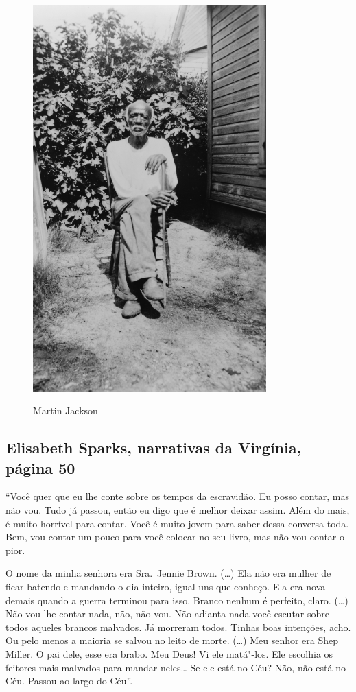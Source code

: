 \pagebreak
\thispagestyle{empty}
\begin{figure}[!ht]
\centering
 \includegraphics[width=90mm]{./imgs/martinjackson_recorte.jpg} \label{img13}
\caption{Martin Jackson}
\end{figure}

\subsection{Elisabeth Sparks, narrativas da Virgínia, página 50}
\label{ref250} 

``Você quer que eu lhe conte sobre os tempos da escravidão. Eu posso
contar, mas não vou. Tudo já passou, então eu digo que é melhor deixar
assim. Além do mais, é muito horrível para contar. Você é muito jovem
para saber dessa conversa toda. Bem, vou contar um pouco para você
colocar no seu livro, mas não vou contar o pior.

O nome da minha senhora era Sra.~Jennie Brown. (\ldots{}) Ela não era
mulher de ficar batendo e mandando o dia inteiro, igual uns que conheço.
Ela era nova demais quando a guerra terminou para isso. Branco nenhum é
perfeito, claro. (\ldots{}) Não vou lhe contar nada, não, não vou. Não
adianta nada você escutar sobre todos aqueles brancos malvados. Já
morreram todos. Tinhas boas intenções, acho. Ou pelo menos a maioria se %
salvou no leito de morte. (\ldots{}) Meu senhor era Shep Miller. O pai
dele, esse era brabo. Meu Deus! Vi ele matá"-los. Ele escolhia os
feitores mais malvados para mandar neles\ldots{} Se ele está no Céu?
Não, não está no Céu. Passou ao largo do Céu''.

